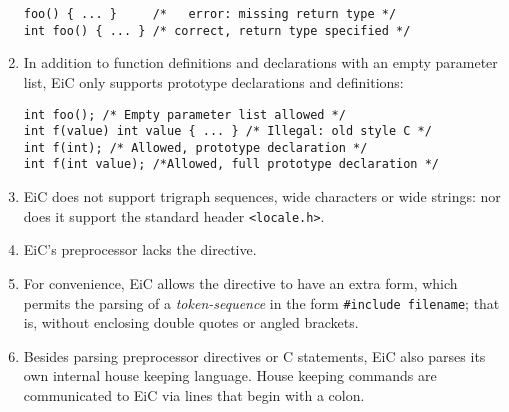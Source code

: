 \documentclass[12pt]{report}
\begin{document}
\begin{enumerate}
\begin{production}
\begin{verbatim}
foo() { ... }     /*   error: missing return type */
int foo() { ... } /* correct, return type specified */ 
\end{verbatim}
\end{production}

\item  In addition to function definitions and declarations with 
an empty parameter list, EiC only supports prototype declarations and
definitions:

\begin{production}
\begin{verbatim}
int foo(); /* Empty parameter list allowed */ 
int f(value) int value { ... } /* Illegal: old style C */ 
int f(int); /* Allowed, prototype declaration */ 
int f(int value); /*Allowed, full prototype declaration */
\end{verbatim}
\end{production}

\item EiC does not support trigraph sequences, wide characters or  
        wide strings: nor does it support the standard header
        \verb+<locale.h>+.

\item EiC's preprocessor lacks the  directive.

\item For convenience, EiC allows the  directive
        to have an extra form, which permits the parsing of a {\it
        token-sequence} in the form \verb+#include filename+; that is,
        without enclosing double quotes or angled brackets.

\item Besides parsing preprocessor directives or C statements, EiC also parses its own
internal house keeping language.
House keeping commands are communicated to EiC via lines that begin
with a colon.

\end{enumerate}
\end{document}

